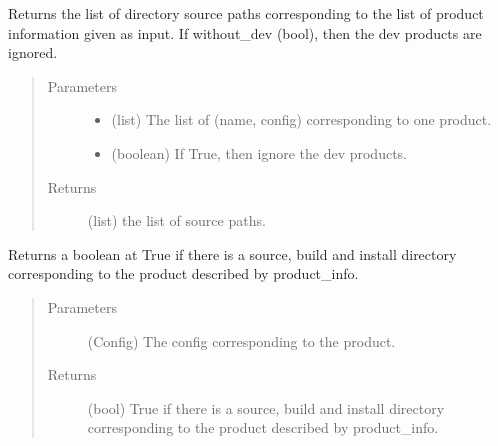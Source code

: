 \documentclass[a4paper,10pt,english]{sphinxmanual}
\begin{document}
\begin{fulllineitems}
\label{\detokenize{apidoc_commands/commands:commands.clean.get_source_directories}}
Returns the list of directory source paths corresponding to the list of 
product information given as input. If without\_dev (bool), then
the dev products are ignored.
\begin{quote}\begin{description}
\item[{Parameters}] \leavevmode\begin{itemize}
\item {} 
 \textendash{} (list) 
The list of (name, config) corresponding to one product.

\item {} 
 \textendash{} (boolean) If True, then ignore the dev products.

\end{itemize}

\item[{Returns}] \leavevmode
(list) the list of source paths.

\end{description}\end{quote}

\end{fulllineitems}


\begin{fulllineitems}
\label{\detokenize{apidoc_commands/commands:commands.clean.product_has_dir}}
Returns a boolean at True if there is a source, build and install
directory corresponding to the product described by product\_info.
\begin{quote}\begin{description}
\item[{Parameters}] \leavevmode
{} \textendash{} (Config) 
The config corresponding to the product.

\item[{Returns}] \leavevmode
(bool)
True if there is a source, build and install
directory corresponding to the product described by product\_info.

\end{description}\end{quote}

\end{fulllineitems}
\end{document}
